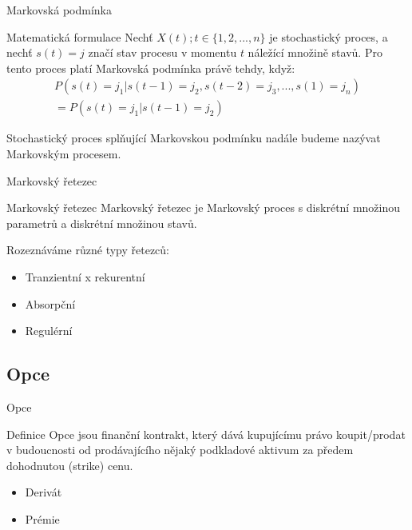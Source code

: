 \documentclass{beamer}
\begin{document}
\begin{frame}{Markovská podmínka}
  \begin{block}{Matematická formulace}
    Nechť $X(t); t \in \{1,2, ... , n\}$ je stochastický proces, a nechť $s(t) = j$ značí stav procesu v momentu $t$ náležící množině stavů. Pro tento proces platí Markovská podmínka právě tehdy, když:
    \begin{multline*}
      P(s(t) = j_1 | s(t-1) = j_2, s(t-2) = j_3, ... , s(1) = j_n) \\
      = P(s(t) = j_1 | s(t-1) = j_2)
    \end{multline*}
    \cite{lukas2009}
  \end{block}

  Stochastický proces splňující Markovskou podmínku nadále budeme nazývat Markovským procesem.
\end{frame}

\begin{frame}{Markovský řetezec}
  \begin{block}{Markovský řetezec}
    Markovský řetezec je Markovský proces s diskrétní množinou parametrů a diskrétní množinou stavů. \cite{lukas2009}
  \end{block}

  Rozeznáváme různé typy řetezců:
  \begin{itemize}
    \item{Tranzientní x rekurentní}
    \item{Absorpční}
    \item{Regulérní}
  \end{itemize}
\end{frame}

\subsection{Opce}

\begin{frame}{Opce}
  \begin{block}{Definice}
    Opce jsou finanční kontrakt, který dává kupujícímu právo koupit/prodat v budoucnosti od prodávajícího nějaký podkladové aktivum za předem dohodnutou (strike) cenu. \cite{plechac2021}
  \end{block}

  \begin{itemize}
    \item Derivát
    \item Prémie
  \end{itemize}
\end{frame}
\end{document}
